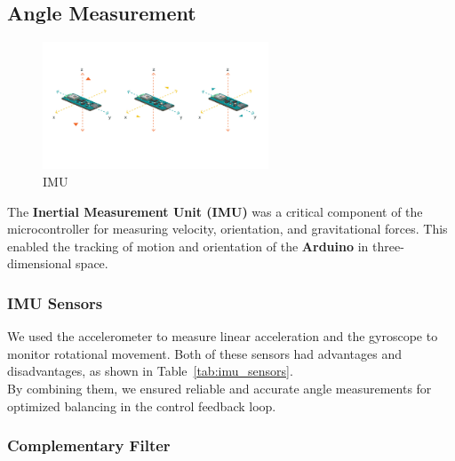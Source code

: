 \documentclass{article}
\begin{document}
\subsection{Angle Measurement}
\label{sec:angle}

\begin{figure}[H]
    \centering
    \includegraphics[width=0.6\textwidth]{Figures/imu.png} %
    \caption{IMU}
    \label{fig:imu}
\end{figure}

\begin{minipage}{\linewidth}
    The \textbf{Inertial Measurement Unit (IMU)} was a critical component of the microcontroller for measuring velocity, orientation, and
    gravitational forces. This enabled the tracking of motion and orientation of the \textbf{Arduino} in three-dimensional space.
\end{minipage}

\subsubsection{IMU Sensors}
\begin{minipage}{\linewidth}
    We used the accelerometer to measure linear acceleration and the gyroscope to monitor rotational
    movement. Both of these sensors had advantages and disadvantages, as shown in Table~\ref{tab:imu_sensors}. \\

    By combining them, we ensured reliable and accurate angle measurements for optimized balancing in the control feedback loop.
\end{minipage}

\subsubsection{Complementary Filter}

\end{document}
